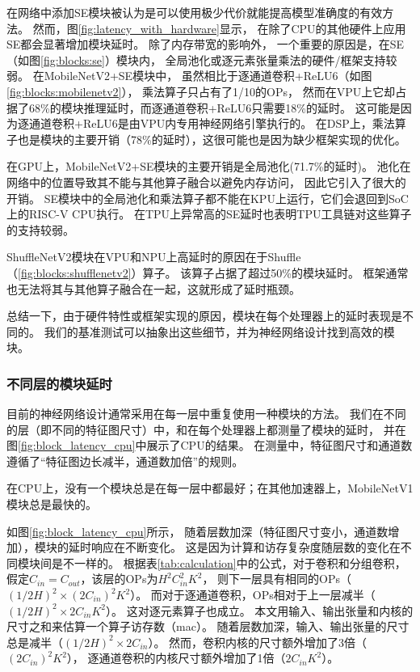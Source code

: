 在网络中添加SE模块被认为是可以使用极少代价就能提高模型准确度的有效方法。
然而，图\ref{fig:latency_with_hardware}显示，
在除了CPU的其他硬件上应用SE都会显著增加模块延时。
除了内存带宽的影响外，
一个重要的原因是，在SE（如图\ref{fig:blocks:se}）模块内，
全局池化或逐元素张量乘法的硬件/框架支持较弱。
在MobileNetV2+SE模块中，
虽然相比于逐通道卷积+ReLU6（如图\ref{fig:blocks:mobilenetv2}），
乘法算子只占有了1/10的OPs，
然而在VPU上它却占据了68\%的模块推理延时，而逐通道卷积+ReLU6只需要18\%的延时。
这可能是因为逐通道卷积+ReLU6是由VPU内专用神经网络引擎执行的。
在DSP上，乘法算子也是模块的主要开销（78\%的延时），这很可能也是因为缺少框架实现的优化。

在GPU上，MobileNetV2+SE模块的主要开销是全局池化(71.7\%的延时)。
池化在网络中的位置导致其不能与其他算子融合以避免内存访问，
因此它引入了很大的开销。
SE模块中的全局池化和乘法算子都不能在KPU上运行，它们会退回到SoC上的RISC-V CPU执行。
在TPU上异常高的SE延时也表明TPU工具链对这些算子的支持较弱。

ShuffleNetV2模块在VPU和NPU上高延时的原因在于Shuffle（\ref{fig:blocks:shufflenetv2}）算子。
该算子占据了超过50\%的模块延时。
框架通常也无法将其与其他算子融合在一起，这就形成了延时瓶颈。

总结一下，由于硬件特性或框架实现的原因，模块在每个处理器上的延时表现是不同的。
我们的基准测试可以抽象出这些细节，并为神经网络设计找到高效的模块。

\subsubsection{不同层的模块延时}
\label{analysis:op block:block with layer}


目前的神经网络设计通常采用在每一层中重复使用一种模块的方法。
我们在不同的层（即不同的特征图尺寸）中，和在每个处理器上都测量了模块的延时，
并在图\ref{fig:block_latency_cpu}中展示了CPU的结果。
在测量中，特征图尺寸和通道数遵循了``特征图边长减半，通道数加倍''的规则。

\begin{finding}
    在CPU上，没有一个模块总是在每一层中都最好；在其他加速器上，MobileNetV1模块总是最快的。
\end{finding}

如图\ref{fig:block_latency_cpu}所示，
随着层数加深（特征图尺寸变小，通道数增加），模块的延时响应在不断变化。
这是因为计算和访存复杂度随层数的变化在不同模块间是不一样的。
根据表\ref{tab:calculation}中的公式，对于卷积和分组卷积，
假定$C_{in}=C_{out}$，该层的OPs为$H^2C_{in}^2K^2$，
则下一层具有相同的OPs（$(1/2H)^2\times (2C_{in})^2K^2$）。
而对于逐通道卷积，OPs相对于上一层减半（$(1/2H)^2\times 2C_{in}K^2$）。
这对逐元素算子也成立。
本文用输入、输出张量和内核的尺寸之和来估算一个算子访存数（mac）。
随着层数加深，输入、输出张量的尺寸总是减半（$(1/2H)^2\times 2C_{in}$）。
然而，卷积内核的尺寸额外增加了3倍（$(2 C_{in})^2K^2$），
逐通道卷积的内核尺寸额外增加了1倍（$2 C_{in}K^2$）。

